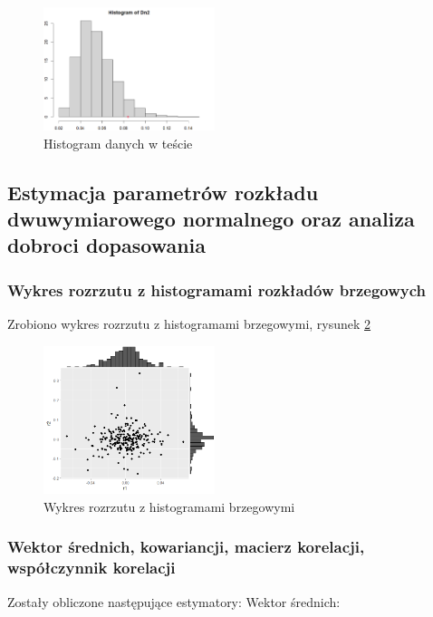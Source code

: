\documentclass[a4paper,11pt]{article}
\def\\{\hfill\break}
\begin{document}
\begin{figure}[!htb]
	\centering
	\includegraphics[width=5cm]{jjb_histMC.png}
	\caption{Histogram danych w teście }
         \label{fig:jjb_histMC}
\end{figure}



\subsection{Estymacja parametrów rozkładu dwuwymiarowego normalnego oraz analiza dobroci dopasowania}


\subsubsection{Wykres rozrzutu z histogramami rozkładów brzegowych}


Zrobiono wykres rozrzutu z histogramami brzegowymi, rysunek \ref{fig:wykres_rozrzutu}

\begin{figure}[!htb]
	\centering
	\includegraphics[width=5cm]{wykres_rozrzutu_histogram.png}
	\caption{Wykres rozrzutu z histogramami brzegowymi}
         \label{fig:wykres_rozrzutu}
\end{figure}


\subsubsection{Wektor średnich, kowariancji, macierz korelacji, współczynnik korelacji}

\newpage
Zostały obliczone następujące estymatory:
\\
Wektor średnich:
\end{document}
